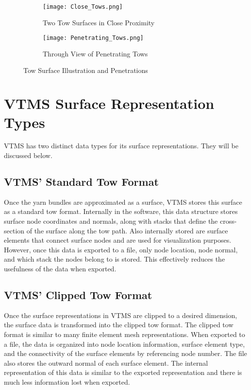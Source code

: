 \begin{figure}[H]
\centering
\begin{subfigure}{.6\textwidth}
  \centering
  \texttt{[image: Close\_Tows.png]}
  \caption{Two Tow Surfaces in Close Proximity}
\end{subfigure}

\begin{subfigure}{.6\textwidth}
  \centering
  \texttt{[image: Penetrating\_Tows.png]}
  \caption{Through View of Penetrating Tows}
\end{subfigure}
\caption{Tow Surface Illustration and Penetrations}
\label{fig:fig}
\end{figure}

\section{VTMS Surface Representation Types}

VTMS has two distinct data types for its surface representations. They will be discussed below.
\subsection*{VTMS' Standard Tow Format}
Once the yarn bundles are approximated as a surface, VTMS stores this surface as a standard tow format. Internally in the software, this data structure stores surface node coordinates and normals, along with stacks that define the cross-section of the surface along the tow path. Also internally stored are surface elements that connect surface nodes and are used for visualization purposes. However, once this data is exported to a file, only node location, node normal, and which stack the nodes belong to is stored. This effectively reduces the usefulness of the data when exported. 

\subsection*{VTMS' Clipped Tow Format}
Once the surface representations in VTMS are clipped to a desired dimension, the surface data is transformed into the clipped tow format. The clipped tow format is similar to many finite element mesh representations. When exported to a file, the data is organized into node location information, surface element type, and the connectivity of the surface elements by referencing node number. The file also stores the outward normal of each surface element. The internal representation of this data is similar to the exported representation and there is much less information lost when exported. 


